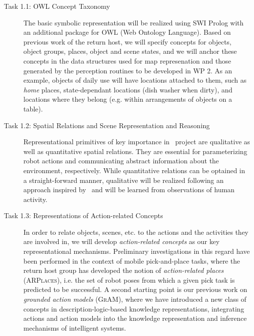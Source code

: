 \begin{description}
  \item[Task 1.1: OWL Concept Taxonomy] The basic symbolic
    representation will be realized using SWI Prolog with an additional
    package for OWL (Web Ontology Language). Based on previous work of
    the return host, we will specify concepts for objects, object groups,
    places, object and scene states, and we will anchor these concepts
    in the data structures used for map represenation and those
    generated by the perception routines to be developed in WP 2.
    As an example, objects of daily use will have locations attached to
    them, such as \emph{home} places, state-dependant locations (dish
    washer when dirty), and locations where they belong (e.g. within
    arrangements of objects on a table).
  \item[Task 1.2: Spatial Relations and Scene Representation and
    Reasoning] Representational primitives of key importance in
    \ksem\ project are qualitative as well as quantitative spatial relations.
    They are essential for parameterizing robot actions and
    communicating abstract information about the environment,
    respectively. While quantitative relations can be optained in a
    straight-forward manner, qualitative will be realized following an
    approach inspired by~\cite{Gapp95} and will be learned from
    observations of human activity.
    
  \item[Task 1.3: Representations of Action-related Concepts]
    In order to relate objects, scenes, etc. to the actions and the
    activities they are involved in, we will develop \emph{action-related
    concepts} as our key representational mechanisms. Preliminary
    investigations in this regard have been performed in the context
    of mobile pick-and-place tasks, where the return host group has
    developed the notion of \emph{action-related places} (\textsc{ARPlaces}), i.e. the
    set of robot poses from which a given pick task is predicted to be
    successful. A second starting point is our previous work on
    \emph{grounded action models} (\textsc{GrAM}), where we have introduced a
    new class of concepts in description-logic-based knowledge
    representations, integrating actions and action models into the
    knowledge representation and inference mechanisms of intelligent
    systems. 
     


\end{description}
